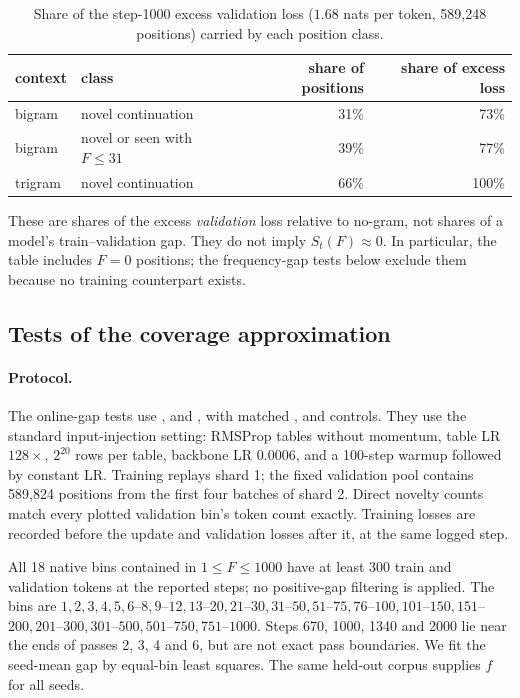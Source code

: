 \begin{table}[!htbp]
\centering\small
\caption{Share of the step-1000 excess validation loss ($1.68$ nats per token, 589{,}248 positions) carried by each position class.}
\label{tab:novel-share}
\begin{tabular}{llrr}
\toprule
context & class & share of positions & share of excess loss \\
\midrule
bigram & novel continuation & 31\% & 73\% \\
bigram & novel or seen with $F\le 31$ & 39\% & 77\% \\
trigram & novel continuation & 66\% & 100\% \\
\bottomrule
\end{tabular}
\end{table}

These are shares of the excess \emph{validation} loss relative to no-gram, not shares of a model's train--validation gap. They do not imply $S_t(F)\approx0$. In particular, the table includes $F=0$ positions; the frequency-gap tests below exclude them because no training counterpart exists.

\subsection{Tests of the coverage approximation}
\label{app:coverage-tests}
\label{app:gt-fits}
\paragraph{Protocol.}
The online-gap tests use ,  and , with matched ,  and  controls. They use the standard input-injection setting: RMSProp tables without momentum, table LR $128\times$, $2^{20}$ rows per table, backbone LR $0.0006$, and a 100-step warmup followed by constant LR. Training replays shard 1; the fixed validation pool contains 589,824 positions from the first four batches of shard 2. Direct novelty counts match every plotted validation bin's token count exactly. Training losses are recorded before the update and validation losses after it, at the same logged step.

All 18 native bins contained in $1\le F\le1000$ have at least 300 train and validation tokens at the reported steps; no positive-gap filtering is applied. The bins are $1,2,3,4,5,6$--$8,9$--$12,13$--$20,21$--$30,31$--$50,51$--$75,76$--$100,101$--$150,151$--$200,201$--$300,301$--$500,501$--$750,751$--$1000$. Steps 670, 1000, 1340 and 2000 lie near the ends of passes 2, 3, 4 and 6, but are not exact pass boundaries. We fit the seed-mean gap by equal-bin least squares. The same held-out corpus supplies $f$ for all seeds.

